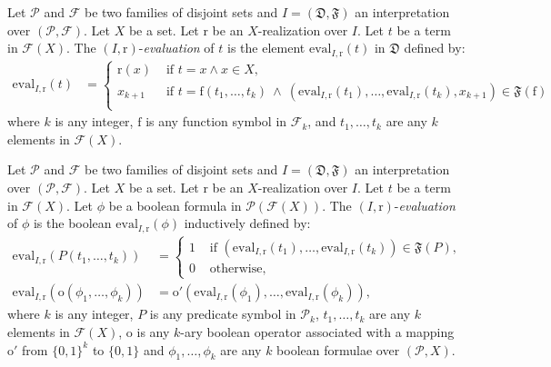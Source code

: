 \documentclass[a4paper]{llncs}
\begin{document}
  \begin{definition}
    Let $\mathcal{P}$ and $\mathcal{F}$ be two families of disjoint sets and $I=(\mathfrak{D},\mathfrak{F})$ an interpretation over $(\mathcal{P},\mathcal{F})$. Let $X$ be a set. Let $\mathrm{r}$ be an $X$-realization over $I$. Let $t$ be a term in $\mathcal{F}(X)$. The $(I,\mathrm{r})$-\emph{evaluation} of $t$ is the element $\mathrm{eval}_{I,\mathrm{r}}(t)$ in $\mathfrak{D}$ defined by:
    \begin{align*}
      \mathrm{eval}_{I,\mathrm{r}}(t)&=
        \begin{cases}
            \mathrm{r}(x) & \text{ if }t=x\wedge x\in X,\\
            x_{k+1} & \text{ if }t=\mathrm{f}(t_1,\ldots,t_k)\ \wedge\ (\mathrm{eval}_{I,\mathrm{r}}(t_1),\ldots,\mathrm{eval}_{I,\mathrm{r}}(t_k),x_{k+1})\in \mathfrak{F}(\mathrm{f})\\
          \end{cases}
    \end{align*}
    where $k$ is any integer, $\mathrm{f}$ is any function symbol in $\mathcal{F}_k$, and $t_1,\ldots,t_k$ are any $k$ elements in $\mathcal{F}(X)$.
  \end{definition}
  
  \begin{definition}
    Let $\mathcal{P}$ and $\mathcal{F}$ be two families of disjoint sets and $I=(\mathfrak{D},\mathfrak{F})$ an interpretation over $(\mathcal{P},\mathcal{F})$. Let $X$ be a set. Let $\mathrm{r}$ be an $X$-realization over $I$. Let $t$ be a term in $\mathcal{F}(X)$. Let $\phi$ be a boolean formula in $\mathcal{P}(\mathcal{F}(X))$. The $(I,\mathrm{r})$-\emph{evaluation} of $\phi$ is the boolean $\mathrm{eval}_{I,\mathrm{r}}(\phi)$ inductively defined by:
  \begin{align*}
        \mathrm{eval}_{I,\mathrm{r}}(P(t_1,\ldots,t_k)) & =
          \begin{cases}
            1 & \text{ if } (\mathrm{eval}_{I,\mathrm{r}}(t_1),\ldots,\mathrm{eval}_{I,\mathrm{r}}(t_k)) \in \mathfrak{F}(P),\\
            0 & \text{ otherwise,}
          \end{cases}\\
        \mathrm{eval}_{I,\mathrm{r}}(\mathrm{o}(\phi_1,\ldots,\phi_k)) & =\mathrm{o}'(\mathrm{eval}_{I,\mathrm{r}}(\phi_1),\ldots,\mathrm{eval}_{I,\mathrm{r}}(\phi_k)),
  \end{align*}
  where $k$ is any integer, $P$ is any predicate symbol in $\mathcal{P}_k$, $t_1,\ldots,t_k$ are any $k$ elements in $\mathcal{F}(X)$, $\mathrm{o}$ is any $k$-ary boolean operator associated with a mapping $\mathrm{o}'$ from $\{0,1\}^k$ to $\{0,1\}$ and $\phi_1,\ldots,\phi_k$ are any $k$ boolean formulae over $(\mathcal{P},X)$.
  \end{definition}
  
\end{document}
